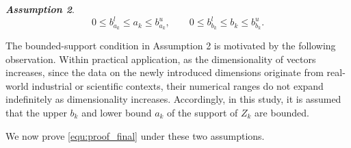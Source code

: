 \noindent \textbf{\textit{Assumption 2}}.
\begin{equation}
0\leq b^{l}_{a_k}\leq a_k\leq b^{u}_{a_k},\qquad
0\leq b^{l}_{b_k}\leq b_k\leq b^{u}_{b_k}.
\end{equation}

The bounded-support condition in Assumption 2 is motivated by the following observation. Within practical application, as the dimensionality of vectors increases, since the data on the newly introduced dimensions originate from real-world industrial or scientific contexts, their numerical ranges do not expand indefinitely as dimensionality increases. Accordingly, in this study, it is assumed that the upper $b_k$ and lower bound $a_k$ of the support of $Z_k$ are bounded.

We now prove \eqref{equ:proof_final} under these two assumptions.

